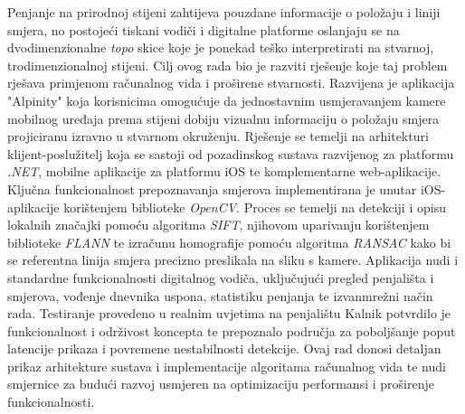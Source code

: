 
\begin{sazetak}
    Penjanje na prirodnoj stijeni zahtijeva pouzdane informacije o položaju i liniji smjera, no postojeći tiskani vodiči i digitalne platforme oslanjaju se na dvodimenzionalne \textit{topo} skice koje je ponekad teško interpretirati na stvarnoj, trodimenzionalnoj stijeni. Cilj ovog rada bio je razviti rješenje koje taj problem rješava primjenom računalnog vida i proširene stvarnosti. Razvijena je aplikacija "Alpinity" koja korisnicima omogućuje da jednostavnim usmjeravanjem kamere mobilnog uređaja prema stijeni dobiju vizualnu informaciju o položaju smjera projiciranu izravno u stvarnom okruženju.
    Rješenje se temelji na arhitekturi klijent-poslužitelj koja se sastoji od pozadinskog sustava razvijenog za platformu \textit{.NET}, mobilne aplikacije za platformu iOS te komplementarne web-aplikacije. Ključna funkcionalnost prepoznavanja smjerova implementirana je unutar iOS-aplikacije korištenjem biblioteke \textit{OpenCV}. Proces se temelji na detekciji i opisu lokalnih značajki pomoću algoritma \textit{SIFT}, njihovom uparivanju korištenjem biblioteke \textit{FLANN} te izračunu homografije pomoću algoritma \textit{RANSAC} kako bi se referentna linija smjera precizno preslikala na sliku s kamere. Aplikacija nudi i standardne funkcionalnosti digitalnog vodiča, uključujući pregled penjališta i smjerova, vođenje dnevnika uspona, statistiku penjanja te izvanmrežni način rada.
    Testiranje provedeno u realnim uvjetima na penjalištu Kalnik potvrdilo je funkcionalnost i održivost koncepta te prepoznalo područja za poboljšanje poput latencije prikaza i povremene nestabilnosti detekcije. Ovaj rad donosi detaljan prikaz arhitekture sustava i implementacije algoritama računalnog vida te nudi smjernice za budući razvoj usmjeren na optimizaciju performansi i proširenje funkcionalnosti.
    
    \end{sazetak}

    \newpage
    
